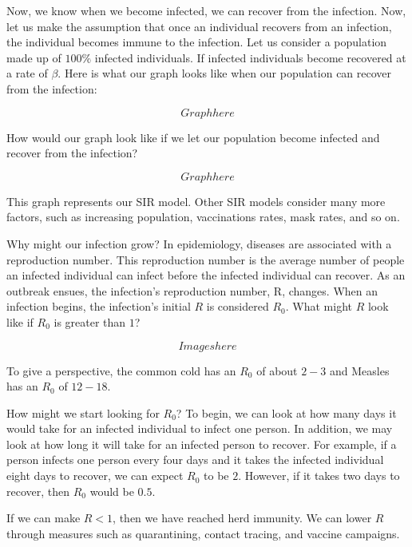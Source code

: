 \documentclass{amsart}
\theoremstyle{definition}
\numberwithin{equation}{section}
\begin{document}
\begin{sansmath}
Now, we know when we become infected, we can recover from the infection. Now, let us make the assumption that once an individual recovers from an infection, the individual becomes immune to the infection. Let us consider a population made up of $100\%$ infected individuals. If infected individuals become recovered at a rate of $\beta$. Here is what our graph looks like when our population can recover from the infection:

\[ Graph here \]

How would our graph look like if we let our population become infected and recover from the infection?

\[ Graph here \]

This graph represents our SIR model. Other SIR models consider many more factors, such as increasing population, vaccinations rates, mask rates, and so on.

Why might our infection grow? In epidemiology, diseases are  associated with a reproduction number. This reproduction number is the average number of people an infected individual can infect before the infected individual can recover. As an outbreak ensues, the infection's reproduction number, R, changes. When an infection begins, the infection's initial $R$ is considered $R_0$. What might $R$ look like if $R_0$ is greater than $1$?

\[ Images here \]

To give a perspective, the common cold has an $R_0$ of about $2-3$ and Measles has an $R_0$ of $12-18$.

How might we start looking for $R_0$? To begin, we can look at how many days it would take for an infected individual to infect one person. In addition, we may look at how long it will take for an infected person to recover. For example, if a person infects one person every four days and it takes the infected individual eight days to recover, we can expect $R_0$ to be $2$. However, if it takes two days to recover, then $R_0$ would be $0.5$.

If we can make $R < 1$, then we have reached herd immunity. We can lower $R$ through measures such as quarantining, contact tracing, and vaccine campaigns.

\newpage


\end{sansmath}
\end{document}
